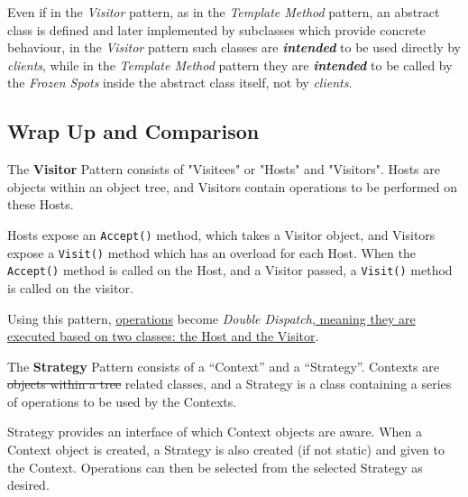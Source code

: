 Even if in the \textit{Visitor} pattern, as in the \textit{Template Method} pattern, an abstract class is defined and later implemented by subclasses which provide concrete behaviour,
in the \textit{Visitor} pattern such classes are \textit{\textbf{intended}} to be used directly by \textit{clients},
while in the \textit{Template Method} pattern they are \textit{\textbf{intended}} to be called by the \textit{Frozen Spots} inside the abstract class itself, not by \textit{clients}.

\subsection{Wrap Up and Comparison}

The \textbf{Visitor} Pattern
consists of "Visitees" or "Hosts" and "Visitors". Hosts are objects within an object tree, and Visitors contain operations to be performed on these Hosts.

Hosts expose an \texttt{Accept()} method, which takes a Visitor object, and Visitors expose a \texttt{Visit()} method which has an overload for each Host. When the \texttt{Accept()} method is called on the Host, and a Visitor passed, a \texttt{Visit()} method is called on the visitor.

Using this pattern, \ul{operations} become \textit{Double Dispatch},\ul{ meaning they are executed based on two classes: the Host and the Visitor}.
\nl

The \textbf{Strategy} Pattern consists of a ``Context'' and a ``Strategy''. Contexts are \st{objects within a tree} related classes, and a Strategy is a class containing a series of operations to be used by the Contexts.

Strategy provides an interface of which Context objects are aware. When a Context object is created, a Strategy is also created (if not static) and given to the Context. Operations can then be selected from the selected Strategy as desired.